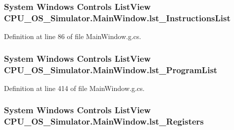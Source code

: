 \subsubsection[{lst\+\_\+\+Instructions\+List}]{\setlength{\rightskip}{0pt plus 5cm}System Windows Controls List\+View C\+P\+U\+\_\+\+O\+S\+\_\+\+Simulator.\+Main\+Window.\+lst\+\_\+\+Instructions\+List\hspace{0.3cm}{\ttfamily [package]}}\label{class_c_p_u___o_s___simulator_1_1_main_window_acdab094f589df9435fa8e3bfe04e61cb}


Definition at line 86 of file Main\+Window.\+g.\+cs.

\hypertarget{class_c_p_u___o_s___simulator_1_1_main_window_ab33f21e0f19eab104e6f67f44d89daeb}{}
\subsubsection[{lst\+\_\+\+Program\+List}]{\setlength{\rightskip}{0pt plus 5cm}System Windows Controls List\+View C\+P\+U\+\_\+\+O\+S\+\_\+\+Simulator.\+Main\+Window.\+lst\+\_\+\+Program\+List\hspace{0.3cm}{\ttfamily [package]}}\label{class_c_p_u___o_s___simulator_1_1_main_window_ab33f21e0f19eab104e6f67f44d89daeb}


Definition at line 414 of file Main\+Window.\+g.\+cs.

\hypertarget{class_c_p_u___o_s___simulator_1_1_main_window_ae88013c536662328670f206a4cab99b1}{}
\subsubsection[{lst\+\_\+\+Registers}]{\setlength{\rightskip}{0pt plus 5cm}System Windows Controls List\+View C\+P\+U\+\_\+\+O\+S\+\_\+\+Simulator.\+Main\+Window.\+lst\+\_\+\+Registers\hspace{0.3cm}{\ttfamily [package]}}\label{class_c_p_u___o_s___simulator_1_1_main_window_ae88013c536662328670f206a4cab99b1}


